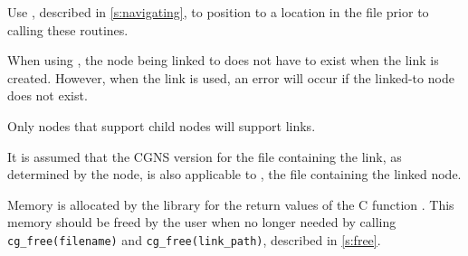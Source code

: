 Use , described in \autoref{s:navigating}, to
position to a location in the file prior to calling these routines.

When using , the node being linked to does not have 
to exist when the link is created.
However, when the link is used, an error will occur if the linked-to
node does not exist.

Only nodes that support child nodes will support links.

It is assumed that the CGNS version for the file containing the link,
as determined by the  node, is also
applicable to , the file containing the linked node.

Memory is allocated by the library for the return values of the C
function .
This memory should be freed by the user when no longer needed by calling
\texttt{cg\_free(filename)} and \texttt{cg\_free(link\_path)}, described
in \autoref{s:free}.
